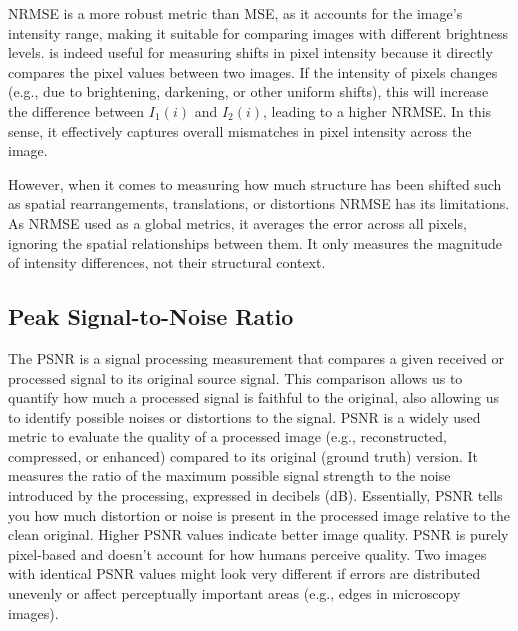 \documentclass[11pt,
  paper=a4, 
  bibliography=totocnumbered,
	captions=tableheading,
	BCOR=10mm
]{scrreprt}
\theoremstyle{definition}
\begin{document}
\vspace{1cm}
\noindent

NRMSE is a more robust metric than MSE, as it accounts for the image’s intensity range, making it suitable for comparing images with different brightness levels.
is indeed useful for measuring shifts in pixel intensity because it directly compares the pixel values between two images. 
If the intensity of pixels changes (e.g., due to brightening, darkening, or other uniform shifts), 
this will increase the difference between $I_1(i)$ and $I_2(i)$, leading to a higher NRMSE. In this sense,
it effectively captures overall mismatches in pixel intensity across the image.

\vspace{1cm}
\noindent
However, when it comes to measuring how much structure has been shifted such as spatial rearrangements, 
translations, or distortions NRMSE has its limitations. As NRMSE used as a global metrics, it averages the error across all pixels, 
ignoring the spatial relationships between them. It only measures the magnitude of intensity differences, not their structural context.





\subsection{Peak Signal-to-Noise Ratio}


The PSNR is a signal processing measurement that compares a given
received or processed signal to its original source signal. This comparison
allows us to quantify how much a processed signal is faithful to the original,
also allowing us to identify possible noises or distortions to the signal. \cite{psnr-paper}
PSNR is a widely used metric to evaluate the quality of a processed image (e.g., reconstructed, compressed, or enhanced) 
compared to its original (ground truth) version. It measures the ratio of the maximum possible signal strength to the noise introduced by the processing, 
expressed in decibels (dB). Essentially, PSNR tells you how much distortion or noise is present in the processed image relative to the clean original.
Higher PSNR values indicate better image quality. 
PSNR is purely pixel-based and doesn’t account for how humans perceive quality. 
Two images with identical PSNR values might look very different if errors are distributed unevenly or affect perceptually important areas (e.g., edges in microscopy images).
\end{document}
